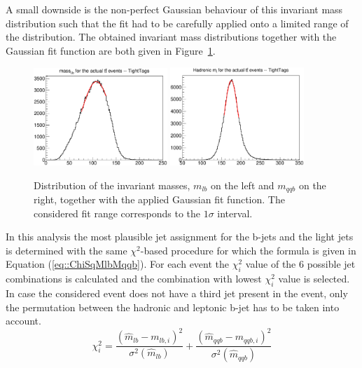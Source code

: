 A small downside is the non-perfect Gaussian behaviour of this invariant mass distribution such that the fit had to be carefully applied onto a limited range of the distribution.
The obtained invariant mass distributions together with the Gaussian fit function are both given in Figure~\ref{fig::InvMasses}. %
\\
\begin{figure}[h!t]
 \centering
 \includegraphics[width = 0.45\textwidth]{Chapters/Chapter4_EvtSel/Figures/MlbMassDistribution.pdf} %
 \includegraphics[width = 0.45\textwidth]{Chapters/Chapter4_EvtSel/Figures/HadrMTopMassDistr.pdf} %
 \caption{Distribution of the invariant masses, $m_{lb}$ on the left and $m_{qqb}$ on the right, together with the applied Gaussian fit function. The considered fit range corresponds to the $1\sigma$ interval.} \label{fig::InvMasses}
\end{figure}

In this analysis the most plausible jet assignment for the b-jets and the light jets is determined with the same $\chi^{2}$-based procedure for which the formula is given in Equation (\ref{eq::ChiSqMlbMqqb}).
For each event the $\chi^{2}_{i}$ value of the 6 possible jet combinations is calculated and the combination with lowest $\chi^2_{i}$ value is selected.
In case the considered event does not have a third jet present in the event, only the permutation between the hadronic and leptonic b-jet has to be taken into account.
\begin{equation} \label{eq::ChiSqMlbMqqb}
 \chi^{2}_{i} = \frac{(\hat{m}_{lb} - m_{lb,i})^{2}}{\sigma^{2}(\hat{m}_{lb})} + \frac{(\hat{m}_{qqb} - m_{qqb,i})^{2}}{\sigma^{2}(\hat{m}_{qqb})}
\end{equation}

